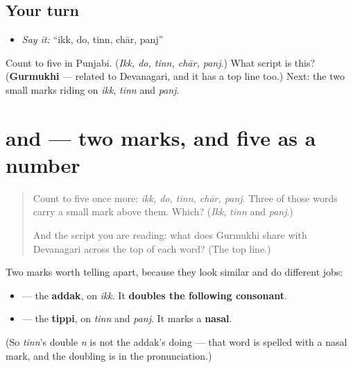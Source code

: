 \subsection*{Your turn}
\begin{itemize}
\raggedright
  \item \emph{Say it:} \textquotedblleft{}ikk, do, tinn, chār, panj\textquotedblright{}
\end{itemize}

\begin{tcolorbox}[breakable,colback=teal!4,colframe=teal!35!black,title={Before you move on}]
Count to five in Punjabi. (\emph{Ikk, do, tinn, chār, panj}.) What script is this? (\textbf{Gurmukhi} — related to Devanagari, and it has a top line too.) Next: the two small marks riding on \emph{ikk}, \emph{tinn} and \emph{panj}.
\end{tcolorbox}
\section[\texorpdfstring{(\pa{ਇੱਕ} \pa{ਦੋ} \pa{ਤਿੰਨ} \pa{ਚਾਰ} \pa{ਪੰਜ}, continued)}{(ਇੱਕ ਦੋ ਤਿੰਨ ਚਾਰ ਪੰਜ, continued)}]{ and  — two marks, and five as a number}

\label{lesson:PA-C06-numbers-1-5-more}



\begin{quote}
Count to five once more: \emph{ikk, do, tinn, chār, panj}. Three of those words carry a small mark above them. Which? (\emph{Ikk}, \emph{tinn} and \emph{panj}.)

And the script you are reading: what does Gurmukhi share with Devanagari across the top of each word? (The top line.)
\end{quote}

\begin{grammarlens}[title={What you've built: two marks that look alike}]
Two marks worth telling apart, because they look similar and do different jobs:

\begin{itemize}
\raggedright
  \item \textbf{} — the \textbf{addak}, on \emph{ikk}. It \textbf{doubles the following consonant}.
  \item \textbf{} — the \textbf{tippi}, on \emph{tinn} and \emph{panj}. It marks a \textbf{nasal}.
\end{itemize}

(So \emph{tinn}'s double \emph{n} is not the addak's doing — that word is spelled with a nasal mark, and the doubling is in the pronunciation.)
\end{grammarlens}

